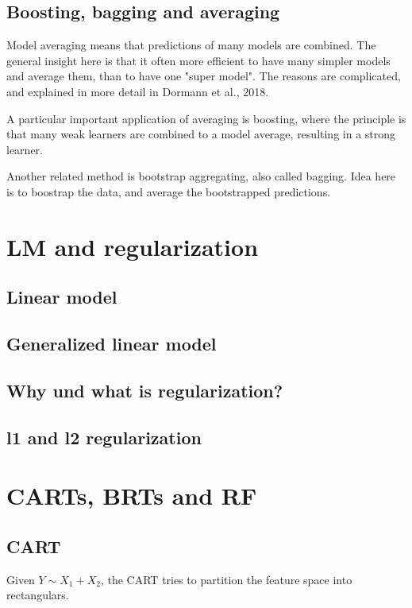 \documentclass[a4paper,twoside]{tufte-book}\usepackage[]{graphicx}\usepackage[]{color}
\begin{document}
\subsection{Boosting, bagging and averaging}

Model averaging means that predictions of many models are combined. The general insight here is that it often more efficient to have many simpler models and average them, than to have one "super model". The reasons are complicated, and explained in more detail in Dormann et al., 2018.

A particular important application of averaging is boosting, where the principle is that many weak learners are combined to a model average, resulting in a strong learner. 

Another related method is bootstrap aggregating, also called bagging. Idea here is to boostrap the data, and average the bootstrapped predictions. 



\section{LM and regularization}

\subsection{Linear model}

\subsection{Generalized linear model}

\subsection{Why und what is regularization?}


\subsection{l1 and l2 regularization}


\section{CARTs, BRTs and RF}

\subsection{CART}
Given $Y \sim X_1 + X_2$, the CART tries to partition the feature space into rectangulars.
\end{document}

